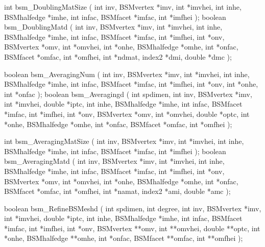 \begin{listingC}
int bsm_DoublingMatSize ( int inv, BSMvertex *imv, int *imvhei,
                          int inhe, BSMhalfedge *imhe,
                          int infac, BSMfacet *imfac, int *imfhei );
boolean bsm_DoublingMatd ( int inv, BSMvertex *imv, int *imvhei,
                           int inhe, BSMhalfedge *imhe,
                           int infac, BSMfacet *imfac, int *imfhei,
                           int *onv, BSMvertex *omv, int *omvhei,  
                           int *onhe, BSMhalfedge *omhe,
                           int *onfac, BSMfacet *omfac, int *omfhei,
                           int *ndmat, index2 *dmi, double *dmc );  
\end{listingC}

\begin{listingC}
boolean bsm_AveragingNum ( int inv, BSMvertex *imv, int *imvhei,
                           int inhe, BSMhalfedge *imhe,
                           int infac, BSMfacet *imfac, int *imfhei,
                           int *onv, int *onhe, int *onfac );
boolean bsm_Averagingd ( int spdimen,
                 int inv, BSMvertex *imv, int *imvhei, double *iptc,
                 int inhe, BSMhalfedge *imhe,
                 int infac, BSMfacet *imfac, int *imfhei,
                 int *onv, BSMvertex *omv, int *omvhei, double
                 *optc,
                 int *onhe, BSMhalfedge *omhe,
                 int *onfac, BSMfacet *omfac, int *omfhei );
\end{listingC}

\begin{listingC}
int bsm_AveragingMatSize ( int inv, BSMvertex *imv, int *imvhei,
                           int inhe, BSMhalfedge *imhe,
                           int infac, BSMfacet *imfac, int *imfhei );
boolean bsm_AveragingMatd ( int inv, BSMvertex *imv, int *imvhei,
                            int inhe, BSMhalfedge *imhe,
                            int infac, BSMfacet *imfac, int *imfhei,
                            int *onv, BSMvertex *omv, int *omvhei,  
                            int *onhe, BSMhalfedge *omhe,
                            int *onfac, BSMfacet *omfac, int *omfhei,
                            int *namat, index2 *ami, double *amc );  
\end{listingC}

\begin{listingC}
boolean bsm_RefineBSMeshd ( int spdimen, int degree,
            int inv, BSMvertex *imv, int *imvhei, double *iptc,
            int inhe, BSMhalfedge *imhe,
            int infac, BSMfacet *imfac, int *imfhei,
            int *onv, BSMvertex **omv, int **omvhei, double **optc,
            int *onhe, BSMhalfedge **omhe,
            int *onfac, BSMfacet **omfac, int **omfhei );

\end{listingC}

